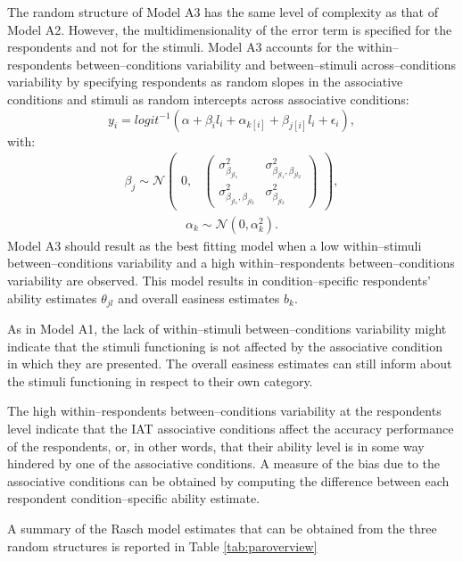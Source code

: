 \documentclass{book}
\begin{document}
The random structure of Model A3 has the same level of complexity as that of Model A2. However, the multidimensionality of the error term is specified for the respondents and not for the stimuli. 
Model A3 accounts for the within--respondents between--conditions variability and between--stimuli across--conditions variability by specifying respondents as random slopes in the associative conditions and stimuli as random intercepts across associative conditions: 
%
\begin{equation}\label{Accuracy1}
	y_{i} = logit^{-1}(\alpha + \beta_il_i + \alpha_{k[i]} +  \beta_{j[i]}l_{i} + \epsilon_{i}),
\end{equation}
with:
\begin{align}
	\beta_{j} \sim  \mathcal{N}
	\begin{pmatrix}
		0,&
		\begin{pmatrix}
			\sigma_{\beta_{jl_1}}^2 & \sigma_{\beta_ {jl_1}, \beta_{jl_2}}^2 \\
			\sigma_{{\beta_{jl_1}}, \beta_{jl_2}}^2& \sigma_{\beta_{jl_2}}^2
		\end{pmatrix}
	\end{pmatrix},
\end{align}
\begin{align}
	\alpha_k \sim \mathcal{N} (0, \alpha_k^2).
\end{align}
%
Model A3 should result as the best fitting model when a low within--stimuli between--conditions variability and a high within--respondents between--conditions variability are observed. This model results in condition--specific respondents' ability estimates $\theta_{jl}$ and overall easiness estimates $b_k$. 

As in Model A1, the lack of within--stimuli between--conditions variability might indicate that the stimuli functioning is not affected by the associative condition in which they are presented. The overall easiness estimates can still inform about the stimuli functioning in respect to their own category. 

The high within--respondents between--conditions variability at the respondents level indicate that the IAT associative conditions affect the accuracy performance of the respondents, or, in other words, that their ability level is in some way hindered by one of the associative conditions.
A measure of the bias due to the associative conditions can be obtained by computing the difference between each respondent condition--specific ability estimate. 

A summary of the Rasch model estimates that can be obtained from the three random structures is reported in Table \ref{tab:paroverview}
\end{document}
